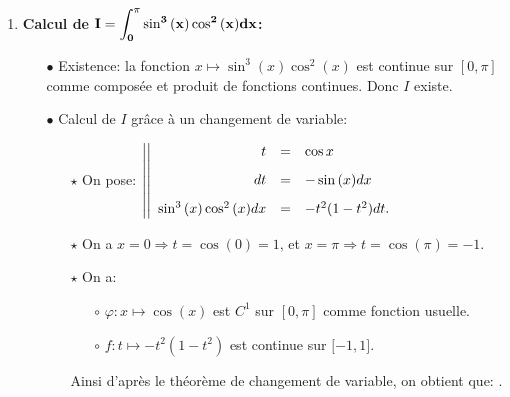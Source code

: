 \documentclass[a4paper, 11pt,reqno]{article}
\begin{document}
\begin{correction}
\begin{enumerate}
		\item \textbf{Calcul de $\mathbf{I=\displaystyle \int_{0}^{\pi} \sin^3{(x)}\cos^2{(x)} dx}$:}
		      \begin{itemize}
			      \item[$\bullet$] Existence: la fonction $x\mapsto  \sin^3{(x)}\cos^2{(x)} $ est continue sur $\left\lbrack 0,\pi \right\rbrack$ comme compos\'ee et produit de fonctions continues. Donc $I$ existe.
			      \item[$\bullet$] Calcul de $I$ gr\^{a}ce \`{a} un changement de variable:
			            \begin{itemize}
				            \item[$\star$] On pose: $\left| \left|\begin{array}{rll}
						                  t                         & = & \cos{x}\vsec      \\
						                  dt                        & = & -\sin{(x)}dx\vsec \\
						                  \sin^3{(x)}\cos^2{(x)} dx & = & -t^2(1-t^2)dt.
					                  \end{array}\right.\right.$
				            \item[$\star$] On a $x=0 \Rightarrow t=\cos(0) = 1$, et $x=\pi \Rightarrow t=\cos\left(\pi\right) = -1$.
				            \item[$\star$] On a:
				                  \begin{itemize}
					                  \item[$\circ$] $\varphi: x\mapsto \cos{(x)}$ est $C^1$ sur $\left\lbrack 0,\pi \right\rbrack$ comme fonction usuelle.
					                  \item[$\circ$] $f: t\mapsto  -t^2(1-t^2)$ est continue sur $\lbrack -1,1\rbrack$.
				                  \end{itemize}
				                  Ainsi d'apr\`{e}s le th\'eor\`{e}me de changement de variable, on obtient que:
				                  .
			            \end{itemize}
		      \end{itemize}

\end{enumerate}
\end{correction}
\end{document}
